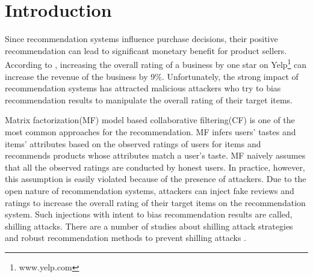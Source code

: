 \documentclass[master,english,final]{kaist-ucs}
\begin{document}
    \tableofcontents

    \listoftables

    \listoffigures



\chapter{Introduction}

Since recommendation systems influence purchase decisions, their positive recommendation can lead to significant monetary benefit for product sellers.
According to \cite{yelp_study}, increasing the overall rating of a business by one star on Yelp\footnote{www.yelp.com} can increase the revenue of the business by 9\%.
Unfortunately, the strong impact of recommendation systems has attracted malicious attackers who try to bias recommendation results to manipulate the overall rating of their target items.

Matrix factorization(MF) model based collaborative filtering(CF) \cite{MF_CF} is one of the most common approaches for the recommendation.
MF infers users’ tastes and items’ attributes based on the observed ratings of users for items and recommends products whose attributes match a user’s taste.
MF naively assumes that all the observed ratings are conducted by honest users.
In practice, however, this assumption is easily violated because of the presence of attackers.
Due to the open nature of recommendation systems, attackers can inject fake reviews and ratings to increase the overall rating of their target items on the recommendation system.
Such injections with intent to bias recommendation results are called, shilling attacks.
There are a number of studies about shilling attack strategies \cite{shilling_attack_1,shilling_attack_2,shilling_attack_3,shilling_attack_guide} and robust recommendation methods to prevent shilling attacks \cite{RMF, AttackResistant,LiesAndPropaganda,UnsupervisedShilling,text_duplicate, text_crowd}.
\end{document}
